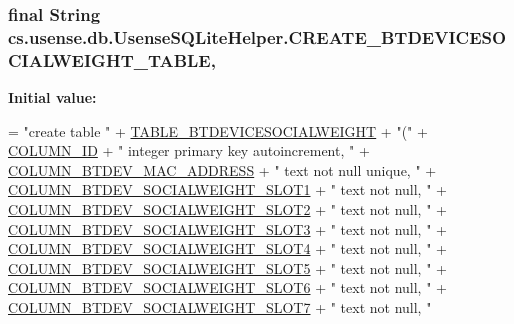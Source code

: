 \subsubsection[{C\+R\+E\+A\+T\+E\+\_\+\+B\+T\+D\+E\+V\+I\+C\+E\+S\+O\+C\+I\+A\+L\+W\+E\+I\+G\+H\+T\+\_\+\+T\+A\+B\+L\+E}]{\setlength{\rightskip}{0pt plus 5cm}final String cs.\+usense.\+db.\+Usense\+S\+Q\+Lite\+Helper.\+C\+R\+E\+A\+T\+E\+\_\+\+B\+T\+D\+E\+V\+I\+C\+E\+S\+O\+C\+I\+A\+L\+W\+E\+I\+G\+H\+T\+\_\+\+T\+A\+B\+L\+E\hspace{0.3cm}{\ttfamily [static]}, {\ttfamily [private]}}\label{classcs_1_1usense_1_1db_1_1_usense_s_q_lite_helper_a4f60096ccac9316a6cdc8a3df65630d2}
{\bfseries Initial value\+:}
\begin{DoxyCode}
= \textcolor{stringliteral}{"create table "}
            + \hyperlink{classcs_1_1usense_1_1db_1_1_usense_s_q_lite_helper_a3117177181b1ec57cc8a354b61a798ac}{TABLE\_BTDEVICESOCIALWEIGHT} + \textcolor{stringliteral}{"("}
            + \hyperlink{classcs_1_1usense_1_1db_1_1_usense_s_q_lite_helper_ac0c4ad3a273f5adda9bdfc60e679379d}{COLUMN\_ID} + \textcolor{stringliteral}{" integer primary key autoincrement, "}
            + \hyperlink{classcs_1_1usense_1_1db_1_1_usense_s_q_lite_helper_a88746e54f676544fb8a10c6e2fd5843b}{COLUMN\_BTDEV\_MAC\_ADDRESS} + \textcolor{stringliteral}{" text not null unique, "}
            + \hyperlink{classcs_1_1usense_1_1db_1_1_usense_s_q_lite_helper_ace65d564b260a05a185289dad7bf6f31}{COLUMN\_BTDEV\_SOCIALWEIGHT\_SLOT1} + \textcolor{stringliteral}{" text not null, "}
            + \hyperlink{classcs_1_1usense_1_1db_1_1_usense_s_q_lite_helper_a29547f3a66a3b685b1cfc7f5e09d351c}{COLUMN\_BTDEV\_SOCIALWEIGHT\_SLOT2} + \textcolor{stringliteral}{" text not null, "}
            + \hyperlink{classcs_1_1usense_1_1db_1_1_usense_s_q_lite_helper_a6e3cc2817324d8f6cfe77246b1a3369d}{COLUMN\_BTDEV\_SOCIALWEIGHT\_SLOT3} + \textcolor{stringliteral}{" text not null, "}
            + \hyperlink{classcs_1_1usense_1_1db_1_1_usense_s_q_lite_helper_ad33b471ce83418cd13fa678cdd1c6905}{COLUMN\_BTDEV\_SOCIALWEIGHT\_SLOT4} + \textcolor{stringliteral}{" text not null, "}
            + \hyperlink{classcs_1_1usense_1_1db_1_1_usense_s_q_lite_helper_a215d55a30924a8ee18e46ca2d5ac3e8d}{COLUMN\_BTDEV\_SOCIALWEIGHT\_SLOT5} + \textcolor{stringliteral}{" text not null, "}
            + \hyperlink{classcs_1_1usense_1_1db_1_1_usense_s_q_lite_helper_aabc755c88b637b8577cefb2299b23101}{COLUMN\_BTDEV\_SOCIALWEIGHT\_SLOT6} + \textcolor{stringliteral}{" text not null, "}
            + \hyperlink{classcs_1_1usense_1_1db_1_1_usense_s_q_lite_helper_a27b438cb885971afa81a27739fd24e28}{COLUMN\_BTDEV\_SOCIALWEIGHT\_SLOT7} + \textcolor{stringliteral}{" text not null, "}

\end{DoxyCode}
